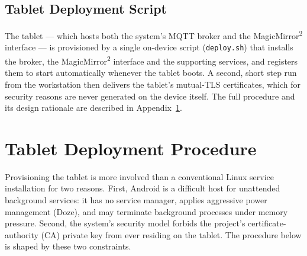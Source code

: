 %


\subsection{Tablet Deployment Script}
\label{sec:tablet-deployment}

The tablet --- which hosts both the system's MQTT broker and the
MagicMirror\textsuperscript{2} interface --- is provisioned by a single on-device
script (\texttt{deploy.sh}) that installs the broker, the
MagicMirror\textsuperscript{2} interface and the supporting services, and registers
them to start automatically whenever the tablet boots. A second, short step run
from the workstation then delivers the tablet's mutual-TLS certificates, which for
security reasons are never generated on the device itself. The full procedure and
its design rationale are described in Appendix~\ref{app:tablet-deploy}.


\section{Tablet Deployment Procedure}
\label{app:tablet-deploy}

Provisioning the tablet is more involved than a conventional Linux service
installation for two reasons. First, Android is a difficult host for unattended
background services: it has no service manager, applies aggressive power management
(Doze), and may terminate background processes under memory pressure. Second, the
system's security model forbids the project's certificate-authority (CA) private
key from ever residing on the tablet. The procedure below is shaped by these two
constraints.

